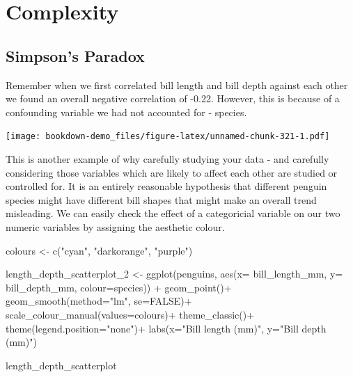 \documentclass[
]{book}
\newenvironment{Shaded}{\begin{snugshade}}{\end{snugshade}}
\newcommand{\AttributeTok}[1]{\textcolor[rgb]{0.77,0.63,0.00}{#1}}
\newcommand{\ConstantTok}[1]{\textcolor[rgb]{0.00,0.00,0.00}{#1}}
\newcommand{\FunctionTok}[1]{\textcolor[rgb]{0.00,0.00,0.00}{#1}}
\newcommand{\NormalTok}[1]{#1}
\newcommand{\OtherTok}[1]{\textcolor[rgb]{0.56,0.35,0.01}{#1}}
\newcommand{\SpecialCharTok}[1]{\textcolor[rgb]{0.00,0.00,0.00}{#1}}
\newcommand{\StringTok}[1]{\textcolor[rgb]{0.31,0.60,0.02}{#1}}
\begin{document}
\hypertarget{complexity}{%
\section{Complexity}\label{complexity}}

\hypertarget{simpsons-paradox}{%
\subsection{Simpson's Paradox}\label{simpsons-paradox}}

Remember when we first correlated bill length and bill depth against each other we found an overall negative correlation of -0.22. However, this is because of a confounding variable we had not accounted for - species.

\texttt{[image: bookdown-demo\_files/figure-latex/unnamed-chunk-321-1.pdf]}

This is another example of why carefully studying your data - and carefully considering those variables which are likely to affect each other are studied or controlled for. It is an entirely reasonable hypothesis that different penguin species might have different bill shapes that might make an overall trend misleading. We can easily check the effect of a categoricial variable on our two numeric variables by assigning the aesthetic colour.

\begin{Shaded}
\begin{Highlighting}[]
\NormalTok{colours }\OtherTok{\textless{}{-}} \FunctionTok{c}\NormalTok{(}\StringTok{"cyan"}\NormalTok{,}
             \StringTok{"darkorange"}\NormalTok{,}
             \StringTok{"purple"}\NormalTok{)}

\NormalTok{length\_depth\_scatterplot\_2 }\OtherTok{\textless{}{-}} \FunctionTok{ggplot}\NormalTok{(penguins, }\FunctionTok{aes}\NormalTok{(}\AttributeTok{x=}\NormalTok{ bill\_length\_mm, }
                     \AttributeTok{y=}\NormalTok{ bill\_depth\_mm,}
                     \AttributeTok{colour=}\NormalTok{species)) }\SpecialCharTok{+}
    \FunctionTok{geom\_point}\NormalTok{()}\SpecialCharTok{+}
  \FunctionTok{geom\_smooth}\NormalTok{(}\AttributeTok{method=}\StringTok{"lm"}\NormalTok{,}
              \AttributeTok{se=}\ConstantTok{FALSE}\NormalTok{)}\SpecialCharTok{+}
  \FunctionTok{scale\_colour\_manual}\NormalTok{(}\AttributeTok{values=}\NormalTok{colours)}\SpecialCharTok{+}
  \FunctionTok{theme\_classic}\NormalTok{()}\SpecialCharTok{+}
  \FunctionTok{theme}\NormalTok{(}\AttributeTok{legend.position=}\StringTok{"none"}\NormalTok{)}\SpecialCharTok{+}
    \FunctionTok{labs}\NormalTok{(}\AttributeTok{x=}\StringTok{"Bill length (mm)"}\NormalTok{,}
         \AttributeTok{y=}\StringTok{"Bill depth (mm)"}\NormalTok{)}

\NormalTok{length\_depth\_scatterplot}
\end{Highlighting}
\end{Shaded}
\end{document}

